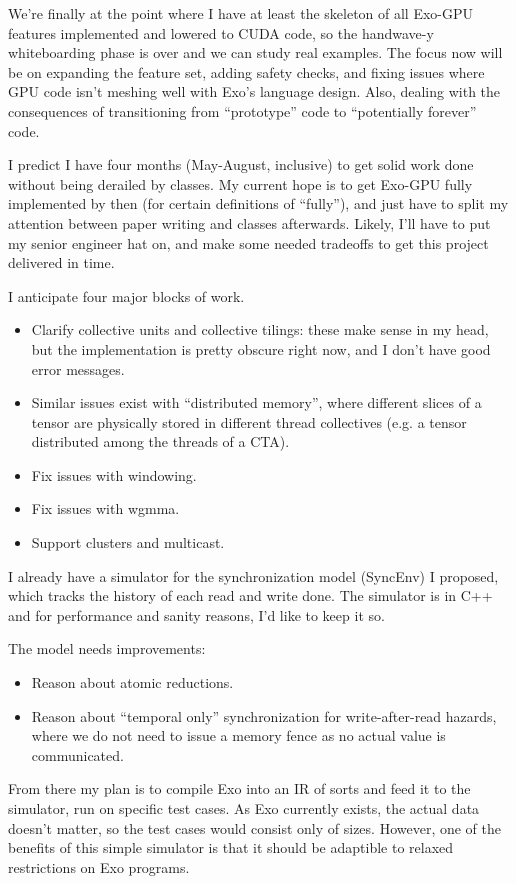 \filbreak
{}

We're finally at the point where I have at least the skeleton of all Exo-GPU features implemented and lowered to CUDA code, so the handwave-y whiteboarding phase is over and we can study real examples.
The focus now will be on expanding the feature set, adding safety checks, and fixing issues where GPU code isn't meshing well with Exo's language design.
Also, dealing with the consequences of transitioning from ``prototype'' code to ``potentially forever'' code.

\filbreak
I predict I have four months (May-August, inclusive) to get solid work done without being derailed by classes.
My current hope is to get Exo-GPU fully implemented by then (for certain definitions of ``fully''), and just have to split my attention between paper writing and classes afterwards.
Likely, I'll have to put my senior engineer hat on, and make some needed tradeoffs to get this project delivered in time.

\filbreak
I anticipate four major blocks of work.

\filbreak
{}

\begin{itemize}
  \item Clarify collective units and collective tilings: these make sense in my head, but the implementation is pretty obscure right now, and I don't have good error messages.
  \filbreak
  \item Similar issues exist with ``distributed memory'', where different slices of a tensor are physically stored in different thread collectives (e.g. a tensor distributed among the threads of a CTA).
  \filbreak
  \item Fix issues with windowing.
  \filbreak
  \item Fix issues with wgmma.
  \filbreak
  \item Support clusters and multicast.
\end{itemize}

\filbreak
{}

I already have a simulator for the synchronization model (SyncEnv) I proposed, which tracks the history of each read and write done.
The simulator is in C++ and for performance and sanity reasons, I'd like to keep it so.

\filbreak
The model needs improvements:
\begin{itemize}
  \item Reason about atomic reductions.
  \filbreak
  \item Reason about ``temporal only'' synchronization for write-after-read hazards, where we do not need to issue a memory fence as no actual value is communicated.
\end{itemize}
\filbreak
From there my plan is to compile Exo into an IR of sorts and feed it to the simulator, run on specific test cases.
As Exo currently exists, the actual data doesn't matter, so the test cases would consist only of sizes.
However, one of the benefits of this simple simulator is that it should be adaptible to relaxed restrictions on Exo programs.

